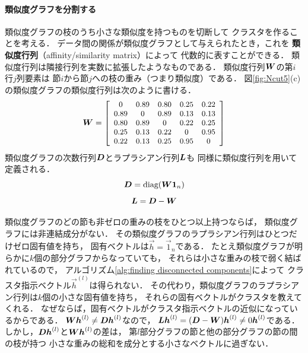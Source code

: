 \paragraph{類似度グラフを分割する}



類似度グラフの枝のうち小さな類似度を持つものを切断して
クラスタを作ることを考える．
データ間の関係が類似度グラフとして与えられたとき，これを
{\bf 類似度行列}（affinity/similarity matrix）によって
代数的に表すことができる．
類似度行列は隣接行列を実数に拡張したようなものである．
類似度行列$\mtr W$の第$i$行$j$列要素は
節$i$から節$j$への枝の重み（つまり類似度）である．
図\ref{fig:Ncut5}(c)の類似度グラフの類似度行列は次のように書ける．
\begin{equation}
 \mtr W=
\smatrix{\small}{ccccc}
{
0 & 0.89 & 0.80 & 0.25 & 0.22\\
0.89 & 0 & 0.89 & 0.13 & 0.13\\
0.80 & 0.89 & 0 & 0.22 & 0.25\\
0.25 & 0.13 & 0.22 & 0 & 0.95\\
0.22 & 0.13 & 0.25 & 0.95 & 0}
\end{equation}
%
類似度グラフの次数行列$\mtr D$とラプラシアン行列$\mtr L$も
同様に類似度行列を用いて定義される．
\begin{equation}
 \mtr D=\diag(\mtr W\vec 1_n)
\end{equation}
\begin{equation}
 \mtr L=\mtr D-\mtr W
\end{equation}

類似度グラフのどの節も非ゼロの重みの枝をひとつ以上持つならば，
類似度グラフには非連結成分がない．
その類似度グラフのラプラシアン行列はひとつだけゼロ固有値を持ち，
固有ベクトルは$\vec h=\vec 1_n$である．
たとえ類似度グラフが明らかに$k$個の部分グラフからなっていても，
それらは小さな重みの枝で弱く結ばれているので，
アルゴリズム\ref{alg:finding disconnected components}によって
クラスタ指示ベクトル$\vec h^{(l)}$は得られない．
その代わり，類似度グラフのラプラシアン行列は$k$個の小さな固有値を持ち，
それらの固有ベクトルがクラスタを教えてくれる．
なぜならば，固有ベクトルがクラスタ指示ベクトルの近似になっているからである．
$\mtr W\vec h^{(l)}\neq\mtr D\vec h^{(l)}$なので，
$\mtr L\vec h^{(l)}=(\mtr D-\mtr W)\vec h^{(l)}\neq 0\vec h^{(l)}$である．
しかし，$\mtr D\vec h^{(l)}$と$\mtr W\vec h^{(l)}$の差は，
第$l$部分グラフの節と他の部分グラフの節の間の枝が持つ
小さな重みの総和を成分とする小さなベクトルに過ぎない．


